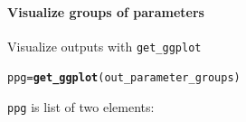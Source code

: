 \documentclass{book}\usepackage[]{graphicx}\usepackage[]{color}
\makeatletter
\newcommand{\hlstd}[1]{\textcolor[rgb]{0.345,0.345,0.345}{#1}}%
\newcommand{\hlkwb}[1]{\textcolor[rgb]{0.69,0.353,0.396}{#1}}%
\newcommand{\hlkwd}[1]{\textcolor[rgb]{0.737,0.353,0.396}{\textbf{#1}}}%
\newenvironment{kframe}{%
 \def\at@end@of@kframe{}%
 \ifinner\ifhmode%
  \def\at@end@of@kframe{\end{minipage}}%
  \begin{minipage}{\columnwidth}%
 \fi\fi%
 \def\FrameCommand##1{\hskip\@totalleftmargin \hskip-\fboxsep
 \colorbox{shadecolor}{##1}\hskip-\fboxsep
     \hskip-\linewidth \hskip-\@totalleftmargin \hskip\columnwidth}%
 \MakeFramed {\advance\hsize-\width
   \@totalleftmargin\z@ \linewidth\hsize
   \@setminipage}}%
 {\par\unskip\endMakeFramed%
 \at@end@of@kframe}
\newenvironment{knitrout}{}{} %
\makeatother
\begin{document}
\paragraph{Visualize groups of parameters}

Visualize outputs with \texttt{get\_ggplot}

\begin{knitrout}
\color{fgcolor}\begin{kframe}
\begin{alltt}
\hlstd{ppg} \hlkwb{=} \hlkwd{get_ggplot}\hlstd{(out_parameter_groups)}
\end{alltt}
\end{kframe}
\end{knitrout}

\texttt{ppg} is list of two elements:
\end{document}
